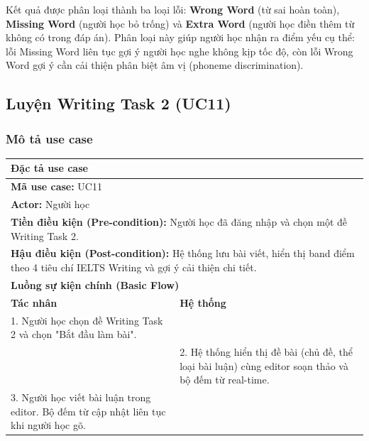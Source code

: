 \documentclass[a4paper,12pt]{extreport}
\begin{document}
Kết quả được phân loại thành ba loại lỗi: \textbf{Wrong Word} (từ sai hoàn toàn), \textbf{Missing Word} (người học bỏ trống) và \textbf{Extra Word} (người học điền thêm từ không có trong đáp án). Phân loại này giúp người học nhận ra điểm yếu cụ thể: lỗi Missing Word liên tục gợi ý người học nghe không kịp tốc độ, còn lỗi Wrong Word gợi ý cần cải thiện phân biệt âm vị (phoneme discrimination).

\subsection{Luyện Writing Task 2 (UC11)}
\subsubsection{Mô tả use case}
\begin{table}[!ht]
    \centering
    \renewcommand{\arraystretch}{1.1}
    \begin{tabularx}{\linewidth}{|X|X|}
        \hline
        \multicolumn{2}{|l|}{\textbf{Đặc tả use case}} \\ \hline
        \multicolumn{2}{|l|}{\textbf{Mã use case:} UC11} \\ \hline
        \multicolumn{2}{|l|}{\textbf{Actor:} Người học} \\ \hline
        \multicolumn{2}{|p{\dimexpr\linewidth-2\tabcolsep-2\arrayrulewidth}|}{\textbf{Tiền điều kiện (Pre-condition):} Người học đã đăng nhập và chọn một đề Writing Task 2.} \\ \hline
        \multicolumn{2}{|p{\dimexpr\linewidth-2\tabcolsep-2\arrayrulewidth}|}{\textbf{Hậu điều kiện (Post-condition):} Hệ thống lưu bài viết, hiển thị band điểm theo 4 tiêu chí IELTS Writing và gợi ý cải thiện chi tiết.} \\ \hline
        \multicolumn{2}{|l|}{\textbf{Luồng sự kiện chính (Basic Flow)}} \\ \hline
        \textbf{Tác nhân} & \textbf{Hệ thống} \\ \hline

        1. Người học chọn đề Writing Task 2 và chọn "Bắt đầu làm bài". & \\ \hline

        & 2. Hệ thống hiển thị đề bài (chủ đề, thể loại bài luận) cùng editor soạn thảo và bộ đếm từ real-time. \\ \hline

        3. Người học viết bài luận trong editor. Bộ đếm từ cập nhật liên tục khi người học gõ. & \\ \hline


\end{tabularx}
\end{table}
\end{document}
